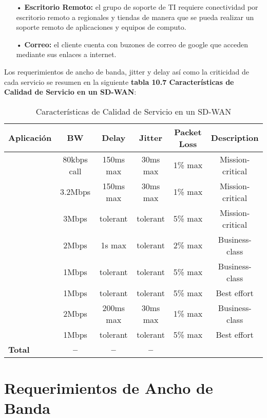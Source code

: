 \begin{itemize}
\item[•]\textbf{Escritorio Remoto:} el grupo de soporte de TI requiere conectividad por escritorio remoto a regionales y tiendas de manera que se pueda realizar un soporte remoto de aplicaciones y equipos de computo.

\item[•]\textbf{Correo:} el cliente cuenta con buzones de correo de google que acceden mediante sus enlaces a internet.
\end{itemize}
Los requerimientos de ancho de banda, jitter y delay así como la criticidad de cada servicio se resumen en la siguiente \textbf{tabla 10.7 Características de Calidad de Servicio en un SD-WAN}:

\begin{table}[ht]
	\caption{Características de Calidad de Servicio en un SD-WAN}
	\label{tab:hla:results}
\centering
\begin{tabular}{lccccc}
	\toprule
	\multicolumn{1}{c}{\textbf{Aplicación}} 	& \textbf{BW}	& \textbf{Delay}	& \textbf{Jitter} 	& \textbf{Packet Loss} & \textbf{Description}\\
	\midrule
\cite{Telefonia} 		& 80kbps call & 150ms max & 30ms max	& 1\% max & Mission-critical\\
\cite{Videoconferencia} & 3.2Mbps & 150ms max & 30ms max & 1\% max & Mission-critical\\
\cite{FTP} 		& 3Mbps & tolerant & tolerant& 5\% max & Mission-critical\\
\cite{CCTV} 		& 2Mbps & 1s max & tolerant	& 2\% max & Business-class\\
\cite{Web Privada} 		& 1Mbps & tolerant & tolerant & 5\% max & Business-class\\
\cite{Internet} 		& 1Mbps & tolerant & tolerant & 5\% max & Best effort\\
\cite{Escritorio remoto} & 2Mbps & 200ms max & 30ms max	& 1\% max & Business-class\\
\cite{Correo} & 1Mbps & tolerant & tolerant	& 5\% max & Best effort\\
	\midrule
	\textbf{Total}			& \textbf{--}		& \textbf{--}		& \textbf{--} \\
	\bottomrule
\end{tabular}
\end{table}

\section{Requerimientos de Ancho de Banda} %
\label{sec:Requerimientos de Ancho de Banda}

